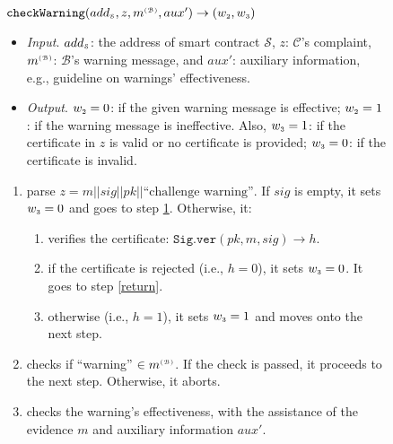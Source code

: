 \vspace{-1mm}
\begin{figure}[!htbp]
\setlength{\fboxsep}{.9pt}
\begin{center}
    \begin{tcolorbox}[enhanced,width=81mm, height=78mm, left=0mm,
    drop fuzzy shadow southwest,
    colframe=black,colback=white]
    {\small{
    \vspace{-2.5mm}
 \underline{$\mathtt{checkWarning}(add_{\scriptscriptstyle\mathcal{S}}, z, m^{\scriptscriptstyle\mathcal{(B)}},  aux')\rightarrow (w_{\scriptscriptstyle 2},  w_{\scriptscriptstyle 3})$}\\
%
\vspace{-2.2mm}
\begin{itemize}[leftmargin=4.2mm]
%
\item \noindent\textit{Input}. $add_{\scriptscriptstyle\mathcal{S}}$: the address of smart contract $\mathcal{S}$, $z$:  $\mathcal{C}$'s complaint, $m^{\scriptscriptstyle\mathcal{(B)}}$:  $\mathcal{B}$'s warning message,  and $aux'$: auxiliary information, e.g., guideline on warnings' effectiveness. 
%
\item\noindent\textit{Output}. $w_{\scriptscriptstyle 2}=0$: if the given warning message is effective; $w_{\scriptscriptstyle 2}=1$: if the  warning message is ineffective. Also, $w_{\scriptscriptstyle 3}=1$: if the certificate in $z$ is valid or no certificate is provided; $ w_{\scriptscriptstyle 3}=0$: if the certificate is invalid. 
%
\end{itemize}
%
\begin{enumerate}[leftmargin=5.2mm]
%
\item parse $z= m||sig||pk||\text{``challenge warning''}$. If  $sig$ is  empty,  it  sets $w_{\scriptscriptstyle 3}=0$ and goes to  step \ref{check-m}. Otherwise, it:
%
\begin{enumerate} 
%
\item verifies the certificate: $\mathtt{Sig.ver}(pk, m, sig)\rightarrow h$. 
%
\item if  the certificate is rejected (i.e., $h=0$),  it sets $w_{\scriptscriptstyle 3}=0$. It  goes to step \ref{return}. 
%
\item otherwise (i.e., $h=1$), it sets $w_{\scriptscriptstyle 3}=1$ and moves onto the next step. 
\end{enumerate}
%
%
\item\label{check-m} checks if ``warning'' $\in m^{\scriptscriptstyle\mathcal{(B)}}$.  If the check is passed, it proceeds to the next step. Otherwise, it aborts. 
%
\item checks the warning's effectiveness, with the assistance of the evidence $m$ and auxiliary information $aux'$. 

\end{enumerate}}}
\end{tcolorbox}
\end{center}
\end{figure}
